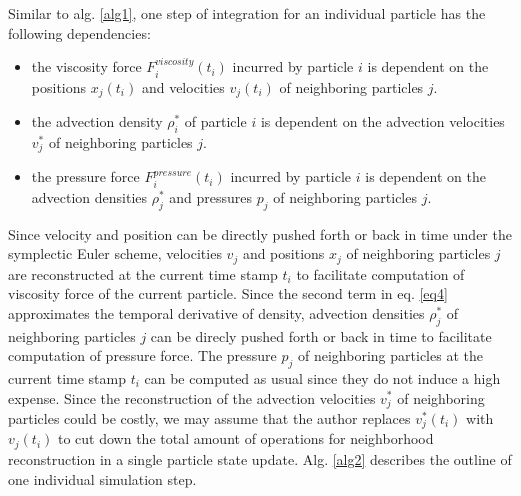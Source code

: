 \documentclass[
	11pt, 
	DIV10,
	ngerman,
	a4paper, 
	oneside, 
	headings=normal, 
	captions=tableheading,
	final, 
	numbers=noenddot
]{scrartcl}
\begin{document}
\par
Similar to alg. \ref{alg1}, one step of integration for an individual particle has the following dependencies:

\begin{itemize}
    \item the viscosity force $ F_{i}^{viscosity}(t_{i}) $ incurred by particle $i$ is dependent on the positions $ x_{j}(t_{i}) $ and velocities $ v_{j}(t_{i}) $ of neighboring particles $j$.
    \item the advection density $ \rho_{i}^{*} $ of particle $i$ is dependent on the advection velocities $ v_{j}^{*} $ of neighboring particles $j$.
    \item the pressure force $ F_{i}^{pressure}(t_{i}) $ incurred by particle $i$ is dependent on the advection densities $ \rho_{j}^{*} $ and pressures $ p_{j} $ of neighboring particles $j$.
\end{itemize}

Since velocity and position can be directly pushed forth or back in time under the symplectic Euler scheme, velocities $ v_{j} $ and positions $ x_{j} $ of neighboring particles $j$ are reconstructed at the current time stamp $ t_{i} $ to facilitate computation of viscosity force of the current particle. Since the second term in eq. \ref{eq4} approximates the temporal derivative of density, advection densities $ \rho_{j}^{*} $ of neighboring particles $j$ can be direcly pushed forth or back in time to facilitate computation of pressure force. The pressure $ p_{j} $ of neighboring particles at the current time stamp $ t_{i} $ can be computed as usual since they do not induce a high expense. Since the reconstruction of the advection velocities $ v_{j}^{*} $ of neighboring particles could be costly, we may assume that the author replaces $ v_{j}^{*}(t_{i}) $ with $ v_{j}(t_{i}) $ to cut down the total amount of operations for neighborhood reconstruction in a single particle state update. Alg. \ref{alg2} describes the outline of one individual simulation step.
\end{document}
